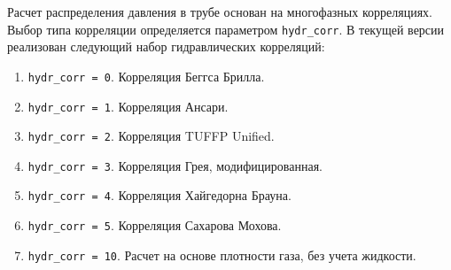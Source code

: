 \begin{comment}
	\item  \texttt{calc_flow_direction=00} расчет идет в направлении убывания координаты и поток идет в том же направлении, смотри рисунок \ref{ris:Pipe_scheme_1_4} d).
\end{enumerate}

Схема расчета \texttt{calc_flow_direction=00} для случая вертикальной добывающей скважины соответствует расчету распределения давления "снизу вверх" - от забойного давления к устьевому, если считать что координата направлена "сверху вниз". То есть если на устье начало координат, а на забое координата равна измеренной глубине, то давление \texttt{p_calc_from_atma} соответствует забойному, а \texttt{p_calc_to_atma} устьевому. 


Схема расчета \texttt{calc_flow_direction=11} для случая вертикальной нагнетательной скважины соответствует расчету распределения давления "сверху вниз" - от устьевого давления к забойному, если считать что координата направлена "сверху вниз". То есть если на устье начало координат, а на забое координата равна измеренной глубине, то давление \texttt{p_calc_from_atma} соответствует устьевому, а \texttt{p_calc_to_atma} забойному. 

\end{comment}




Расчет распределения давления в трубе основан на многофазных корреляциях. Выбор типа корреляции определяется параметром  \texttt{hydr_corr}. В текущей версии \unf{} реализован следующий набор гидравлических корреляций:
\begin{enumerate}
	\item \texttt{hydr_corr = 0}. Корреляция Беггса Брилла.
	\item \texttt{hydr_corr = 1}. Корреляция Ансари.
	\item \texttt{hydr_corr = 2}. Корреляция TUFFP Unified.
	\item \texttt{hydr_corr = 3}. Корреляция Грея, модифицированная.
	\item \texttt{hydr_corr = 4}. Корреляция Хайгедорна Брауна.
	\item \texttt{hydr_corr = 5}. Корреляция Сахарова Мохова.
	\item \texttt{hydr_corr = 10}. Расчет на основе плотности газа, без учета жидкости.
	
\end{enumerate}

